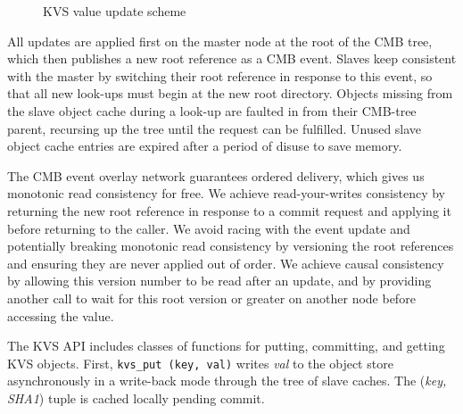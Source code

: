 \begin{figure}[ht]
\vspace{-.5cm}
\centering
\begin{subfigure}[a.b.c = 42.]{
  \label{fig:kvsupdate1}
}%
\end{subfigure}\hfill
\begin{subfigure}[a.b.c = 43 in progress.]{
  \label{fig:kvsupdate2}
}%
\end{subfigure}\hfill
\begin{subfigure}[a.b.c = 43 committed.]{
  \label{fig:kvsupdate3}
}%
\end{subfigure}\hfill
\caption{KVS value update scheme}
\vspace{-.5cm}
\label{fig:kvsupdate}
\end{figure}

All updates are applied first on the master node at the root of the
CMB tree, which then publishes a new root reference as a CMB event.
Slaves keep consistent with the master by switching their root reference
in response to this event, so that all new look-ups must begin at the
new root directory.  Objects missing from the slave object cache during
a look-up are faulted in from their CMB-tree parent, recursing up the tree
until the request can be fulfilled.  Unused slave object cache entries are
expired after a period of disuse to save memory.

The CMB event overlay network guarantees ordered delivery, which gives
us monotonic read consistency for free.  We achieve read-your-writes
consistency by returning the new root reference in response to a commit
request and applying it before returning to the caller.  We avoid
racing with the event update and potentially breaking monotonic read
consistency by versioning the root references and ensuring they are
never applied out of order.
We achieve causal consistency by allowing this version number
to be read after an update, and by providing another call to wait for this
root version or greater on another node before accessing the value.

The KVS API includes classes of functions for putting, committing, and
getting KVS objects.  
First, {\tt kvs\_put (key, val)}
writes {\em val} to the object store asynchronously in a write-back
mode through the tree of slave caches.
The ({\em key, SHA1}) tuple is cached locally pending commit.

